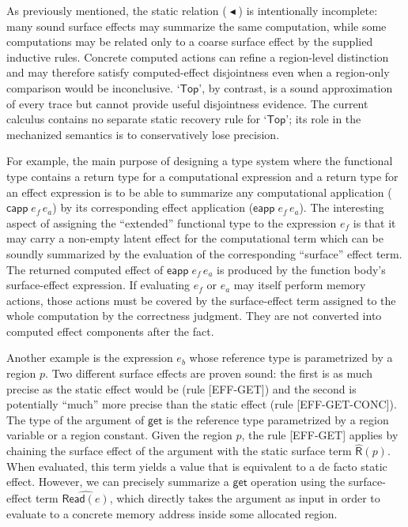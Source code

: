 \documentclass[10pt,a4paper]{article}
\newcommand{\desc}{\mathrel{\blacktriangleleft}}      %
\newcommand{\Read}{\mathsf{Read}}
\newcommand{\Rhat}{\widehat{\mathsf{R}}}
\newcommand{\Top}{\mathsf{Top}}
\newcommand{\capp}{\mathsf{capp}\;}
\newcommand{\eapp}{\mathsf{eapp}\;}
\begin{document}
As previously mentioned, the static relation ($\desc$) is intentionally
incomplete: many sound surface effects may summarize the same computation, while some
computations may be related only to a coarse surface effect by the supplied inductive
rules. Concrete computed actions can refine a region-level distinction and may
therefore satisfy computed-effect disjointness even when a region-only
comparison would be inconclusive. `$\Top$', by contrast, is a sound
approximation of every trace but cannot provide useful disjointness evidence.
The current calculus contains no separate static recovery rule for `$\Top$';
its role in the mechanized semantics is to conservatively lose precision.

For example, the main purpose of designing a type system where the functional
type contains a return type for a computational expression and a return type
for an effect expression is to be able to summarize any computational
application ($\capp e_f\, e_a$) by its corresponding effect application
($\eapp e_f\, e_a$). The interesting aspect of assigning the ``extended''
functional type to the expression $e_f$ is that it may carry a non-empty
latent effect for the computational term which can be soundly summarized by the
evaluation of the corresponding ``surface'' effect term. The returned computed
effect of $\eapp e_f\,e_a$ is produced by the function body's surface-effect
expression.  If evaluating $e_f$ or $e_a$ may itself perform memory actions,
those actions must be covered by the surface-effect term assigned to the whole
computation by the correctness judgment.  They are not converted into computed
effect components after the fact.

Another example is the expression $e_b$ whose reference type is parametrized
by a region $p$. Two different surface effects are proven sound: the first is
as much precise as the static effect would be (rule [EFF-GET]) and the second
is potentially ``much'' more precise than the static effect (rule
[EFF-GET-CONC]). The type of the argument of $\mathsf{get}$ is the reference
type parametrized by a region variable or a region constant. Given the region
$p$, the rule [EFF-GET] applies by chaining the surface effect of the argument
with the static surface term $\Rhat(p)$. When evaluated, this term yields a
value that is equivalent to a de facto static effect. However, we can
precisely summarize a $\mathsf{get}$ operation using the surface-effect term
$\widehat{\Read(e)}$, which directly takes the argument as input in order to evaluate
to a concrete memory address inside some allocated region.
\end{document}
